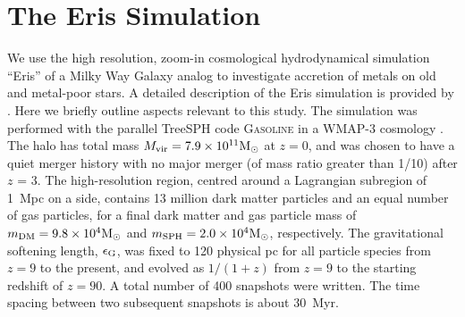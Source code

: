 \documentclass[a4paper,fleqn,usenatbib]{mnras}
\newcommand{\msun}{{\rm M}_{\odot}}
\begin{document}
\section{The Eris Simulation}
\label{sec:erissim}

We use the high resolution, zoom-in cosmological hydrodynamical
simulation ``Eris'' of a Milky Way Galaxy analog to investigate
accretion of metals on old and metal-poor stars.  A detailed
description of the Eris simulation is provided by \citet{Guedes11}.
Here we briefly outline aspects relevant to this study.  The
simulation was performed with the parallel TreeSPH code
\textsc{Gasoline} \citep{Wadsley04} in a WMAP-3 cosmology
\citep{2007ApJS..170..377S}.  The halo has total mass $M_{\rm vir} =
7.9 \times 10^{11} \msun$ at $z = 0$, and was chosen to have a quiet
merger history with no major merger (of mass ratio greater than 1/10)
after $z$ = 3. The high-resolution region, centred around a Lagrangian
subregion of 1~Mpc on a side, contains 13 million dark matter
particles and an equal number of gas particles, for a final dark
matter and gas particle mass of $m_{\rm DM} = 9.8 \times 10^{4} \msun$
and $m_{\rm SPH} = 2.0 \times 10^{4} \msun$, respectively. The
gravitational softening length, $\epsilon_{\rm G}$, was fixed to 120
physical pc for all particle species from $z=9$ to the present, and
evolved as $1/(1+z)$ from $z=9$ to the starting redshift of $z=90$. A
total number of 400 snapshots were written.  The time spacing between
two subsequent snapshots is about 30~Myr.
\end{document}
